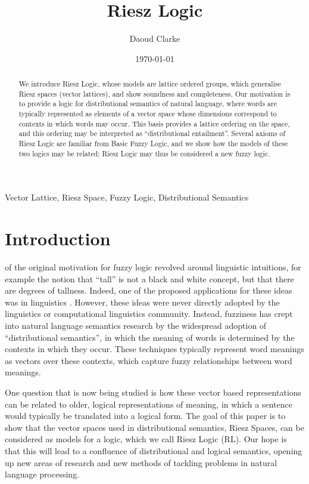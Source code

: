 \documentclass[journal]{IEEEtran}
\author{Daoud Clarke}
\date{\today}
\title{Riesz Logic}
\theoremstyle{definition}
\begin{document}



\maketitle

\begin{abstract}
We introduce Riesz Logic, whose models are lattice ordered groups,
which generalise Riesz spaces (vector lattices), and show soundness
and completeness. Our motivation is to provide a logic for
distributional semantics of natural language, where words are
typically represented as elements of a vector space whose dimensions
correspond to contexts in which words may occur. This basis provides a
lattice ordering on the space, and this ordering may be interpreted as
``distributional entailment''. Several axioms of Riesz Logic are
familiar from Basic Fuzzy Logic, and we show how the models of these
two logics may be related; Riesz Logic may thus be considered a new
fuzzy logic.
\end{abstract}

\begin{IEEEkeywords}
Vector Lattice, Riesz Space, Fuzzy Logic, Distributional Semantics
\end{IEEEkeywords}


\section{Introduction}

 of the original motivation for fuzzy logic revolved around
linguistic intuitions, for example the notion that ``tall'' is not a
black and white concept, but that there are degrees of
tallness. Indeed, one of the proposed applications for these ideas was
in linguistics \cite{Zadeh:73}. However, these ideas were never
directly adopted by the linguistics or computational linguistics
community. Instead, fuzziness has crept into natural language
semantics research by the widespread adoption of ``distributional
semantics'', in which the meaning of words is determined by the
contexts in which they occur. These techniques typically represent
word meanings as vectors over these contexts, which capture fuzzy
relationships between word meanings.

One question that is now being studied is how these vector based
representations can be related to older, logical representations of
meaning, in which a sentence would typically be translated into a
logical form. The goal of this paper is to show that the vector spaces
used in distributional semantics, Riesz Spaces, can be considered as
models for a logic, which we call Riesz Logic (RL). Our hope is that
this will lead to a confluence of distributional and logical
semantics, opening up new areas of research and new methods of
tackling problems in natural language processing.
\end{document}
